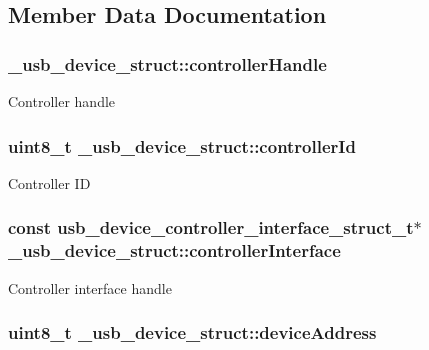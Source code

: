\subsection{Member Data Documentation}
\hypertarget{struct__usb__device__struct_a0590c24c845667193936f0a446d08cb9}{
\subsubsection[{controller\-Handle}]{ \-\_\-usb\-\_\-device\-\_\-struct\-::controller\-Handle}}\label{struct__usb__device__struct_a0590c24c845667193936f0a446d08cb9}
Controller handle \hypertarget{struct__usb__device__struct_ad402e79419d37fc72e7f71fb10ec3289}{
\subsubsection[{controller\-Id}]{\setlength{\rightskip}{0pt plus 5cm}uint8\-\_\-t \-\_\-usb\-\_\-device\-\_\-struct\-::controller\-Id}}\label{struct__usb__device__struct_ad402e79419d37fc72e7f71fb10ec3289}
Controller I\-D \hypertarget{struct__usb__device__struct_aee4a13057112d36193a654fef978f4ae}{
\subsubsection[{controller\-Interface}]{\setlength{\rightskip}{0pt plus 5cm}const {\bf usb\-\_\-device\-\_\-controller\-\_\-interface\-\_\-struct\-\_\-t}$\ast$ \-\_\-usb\-\_\-device\-\_\-struct\-::controller\-Interface}}\label{struct__usb__device__struct_aee4a13057112d36193a654fef978f4ae}
Controller interface handle \hypertarget{struct__usb__device__struct_abae4041d3d8b46a4d06954cd13061424}{
\subsubsection[{device\-Address}]{\setlength{\rightskip}{0pt plus 5cm}uint8\-\_\-t \-\_\-usb\-\_\-device\-\_\-struct\-::device\-Address}}\label{struct__usb__device__struct_abae4041d3d8b46a4d06954cd13061424}
